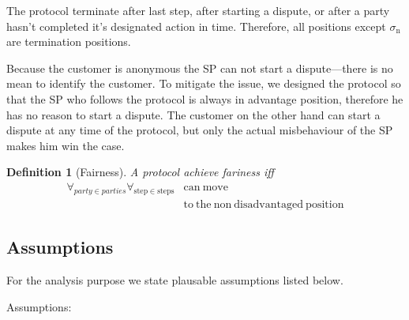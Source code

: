 \documentclass{ieeeaccess}
\newtheorem{definition}{Definition}
\begin{document}
The protocol terminate after last step, after starting a dispute, or
after a party hasn't completed it's designated action in time. Therefore,
all positions except $\sigma_\mathrm{n}$ are termination positions.

Because the customer is anonymous the SP can not start a dispute---there is no mean to identify the customer. To mitigate the issue, we designed the protocol so that the SP who follows the protocol is always in advantage position, therefore he has no reason to start a dispute. The customer on the other hand can start a dispute at any time of the protocol, but only the actual misbehaviour of the SP makes him win the case.

\begin{definition}[Fairness] \label{fairness}
A protocol achieve fariness iff 
\begin{equation*}
\begin{split}
\forall_{party \in parties}\forall_{\mathrm{step} \in \mathrm{steps}} &\mathrm{can\ move}\\
&\mathrm{to\ the\ non\ disadvantaged\ position} 
\end{split}
\end{equation*}

\end{definition}


\subsection{Assumptions}\label{assumptions}

For the analysis purpose we state plausable assumptions listed below.

Assumptions:
\end{document}
